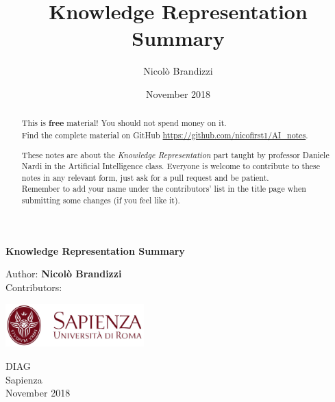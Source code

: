 \documentclass[10pt,a4paper]{article}
\author{Nicolò Brandizzi}
\title{Knowledge Representation Summary}
\date{November 2018}
\begin{document}
\begin{titlepage}
    \begin{center}
        \vspace*{1cm}
        
        \Huge
        \textbf{Knowledge Representation Summary}
        
        
        \vspace{1.5cm}
        
        Author:
        \textbf{Nicolò Brandizzi}\\
        \vspace{0.5cm}
        \Large
        Contributors:
        \textbf{}%
        
        \vfill
        
        \includegraphics[width=0.4\textwidth]{images/sapienza_logo.jpg}


        
        \vfill
        
  

        \vspace{0.8cm}
        
        
        \Large
        DIAG\\
        Sapienza\\
        November 2018

    \end{center}
\end{titlepage}


\tableofcontents
\newpage
\begin{abstract}
This is \textbf{free} material! You should not spend money on it.\\
Find the complete material on GitHub \url{https://github.com/nicofirst1/AI_notes}.

These notes are about the \textit{Knowledge Representation} part taught by professor Daniele Nardi in the Artificial Intelligence class. Everyone is welcome to contribute to these notes in any relevant form, just ask for a pull request and be patient.\\ Remember to add your name under the contributors' list in the title page when submitting some changes (if you feel like it).
\end{abstract}

\newpage
\end{document}
